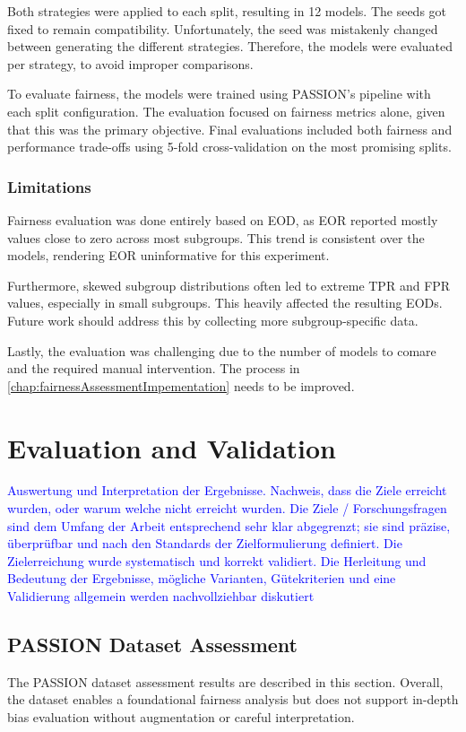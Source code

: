 \documentclass[12pt, a4paper, oneside]{book}   	%
\newcommand{\baaCriteria}[1]{\textcolor{blue}{#1}}
\begin{document}
		Both strategies were applied to each split, resulting in 12 models. The seeds got fixed to remain compatibility. Unfortunately, the seed was mistakenly changed between generating the different strategies. Therefore, the models were evaluated per strategy, to avoid improper comparisons.
		
		To evaluate fairness, the models were trained using PASSION's pipeline with each split configuration. The evaluation focused on fairness metrics alone, given that this was the primary objective. Final evaluations included both fairness and performance trade-offs using 5-fold cross-validation on the most promising splits.
		
		\subsection{Limitations}
		Fairness evaluation was done entirely based on \gls{EOD}, as \gls{EOR} reported mostly values close to zero across most subgroups. This trend is consistent over the models, rendering \gls{EOR} uninformative for this experiment. 
		
		Furthermore, skewed subgroup distributions often led to extreme \gls{TPR} and \gls{FPR} values, especially in small subgroups. This heavily affected the resulting \glspl{EOD}. Future work should address this by collecting more subgroup-specific data.
		
		Lastly, the evaluation was challenging due to the number of models to comare and the required manual intervention. The process in \autoref{chap:fairnessAssessmentImpementation} needs to be improved.
		
		
	\chapter{Evaluation and Validation}
		\baaCriteria{Auswertung und Interpretation der Ergebnisse. Nachweis, dass die Ziele erreicht wurden, oder warum	welche nicht erreicht wurden.}
		\baaCriteria{Die Ziele / Forschungsfragen sind dem Umfang der Arbeit entsprechend sehr klar abgegrenzt; sie sind präzise, überprüfbar und nach den Standards der Zielformulierung definiert. Die Zielerreichung wurde systematisch und korrekt validiert.}
		\baaCriteria{Die Herleitung und Bedeutung der Ergebnisse, mögliche Varianten, Gütekriterien und eine Validierung allgemein werden nachvollziehbar diskutiert}
		
		
		\section{PASSION Dataset Assessment}
		The PASSION dataset assessment results are described in this section.
		Overall, the dataset enables a foundational fairness analysis but does not support in-depth bias evaluation without augmentation or careful interpretation.
		
\end{document}
